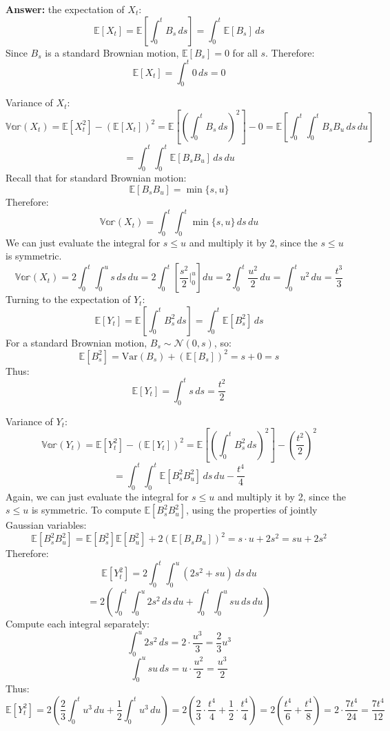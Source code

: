 \documentclass[11pt]{extarticle}
\theoremstyle{plain}
\theoremstyle{definition}
\begin{document}
\begin{enumerate}[(a)]
\textbf{Answer:} the expectation of $X_t$:
    \[
    \mathbb{E}[X_t] = \mathbb{E}\left[ \int_0^t B_s \, ds \right] = \int_0^t \mathbb{E}[B_s] \, ds
    \]
    Since \( B_s \) is a standard Brownian motion, \( \mathbb{E}[B_s] = 0 \) for all \( s \). Therefore:
    \[
    \mathbb{E}[X_t] = \int_0^t 0 \, ds = 0
    \]

Variance of \( X_t \):
    \[
    \mathbb{Var}(X_t) = \mathbb{E}[X_t^2] - (\mathbb{E}[X_t])^2 = \mathbb{E}\left[ \left( \int_0^t B_s \, ds \right)^2 \right] - 0 = \mathbb{E}\left[ \int_0^t \int_0^t B_s B_u \, ds \, du \right]
    \]
    \[
    = \int_0^t \int_0^t \mathbb{E}[B_s B_u] \, ds \, du
    \]
    Recall that for standard Brownian motion:
    \[
    \mathbb{E}[B_s B_u] = \min\{s, u\}
    \]
    Therefore:
    \[
    \mathbb{Var}(X_t) = \int_0^t \int_0^t \min\{s, u\} \, ds \, du
    \]
    We can just evaluate the integral for $s\leq u$ and multiply it by 2, since the $s\leq u$ is symmetric.
    \[
    \mathbb{Var}(X_t) = 2 \int_0^t \int_0^u s \, ds \, du = 2 \int_0^t \left[ \frac{s^2}{2} \Big|_{0}^{u} \right] du = 2 \int_0^t \frac{u^2}{2} \, du = \int_0^t u^2 \, du = \frac{t^3}{3}
    \]
Turning to the expectation of $Y_t$:
    \[
    \mathbb{E}[Y_t] = \mathbb{E}\left[ \int_0^t B_s^2 \, ds \right] = \int_0^t \mathbb{E}[B_s^2] \, ds
    \]
    For a standard Brownian motion, \( B_s \sim \mathcal{N}(0, s) \), so:
    \[
    \mathbb{E}[B_s^2] = \text{Var}(B_s) + (\mathbb{E}[B_s])^2 = s + 0 = s
    \]
    Thus:
    \[
    \mathbb{E}[Y_t] = \int_0^t s \, ds = \frac{t^2}{2}
    \]

    Variance of \( Y_t \):
    \[
    \mathbb{Var}(Y_t) = \mathbb{E}[Y_t^2] - (\mathbb{E}[Y_t])^2 = \mathbb{E}\left[ \left( \int_0^t B_s^2 \, ds \right)^2 \right] - \left( \frac{t^2}{2} \right)^2
    \]
    \[
    = \int_0^t \int_0^t \mathbb{E}[B_s^2 B_u^2] \, ds \, du - \frac{t^4}{4}
    \]
    Again, we can just evaluate the integral for $s\leq u$ and multiply it by 2, since the $s\leq u$ is symmetric. To compute \( \mathbb{E}[B_s^2 B_u^2] \), using the properties of jointly Gaussian variables:
    \[
    \mathbb{E}[B_s^2 B_u^2] = \mathbb{E}[B_s^2] \mathbb{E}[B_u^2] + 2 (\mathbb{E}[B_s B_u])^2 = s \cdot u + 2 s^2 = s u + 2 s^2
    \]
    Therefore:
    \[
    \mathbb{E}[Y_t^2] = 2 \int_0^t \int_0^u (2 s^2 + s u) \, ds \, du
    \]
    \[
    = 2 \left( \int_0^t \int_0^u 2 s^2 \, ds \, du + \int_0^t \int_0^u s u \, ds \, du \right)
    \]
    Compute each integral separately:
    \[
    \int_0^u 2 s^2 \, ds = 2 \cdot \frac{u^3}{3} = \frac{2}{3} u^3
    \]
    \[
    \int_0^u s u \, ds = u \cdot \frac{u^2}{2} = \frac{u^3}{2}
    \]
    Thus:
    \[
    \mathbb{E}[Y_t^2] = 2 \left( \frac{2}{3} \int_0^t u^3 \, du + \frac{1}{2} \int_0^t u^3 \, du \right ) = 2 \left( \frac{2}{3} \cdot \frac{t^4}{4} + \frac{1}{2} \cdot \frac{t^4}{4} \right ) = 2 \left( \frac{t^4}{6} + \frac{t^4}{8} \right ) = 2 \cdot \frac{7 t^4}{24} = \frac{7 t^4}{12}
    \]
    

\end{enumerate}
\end{document}
